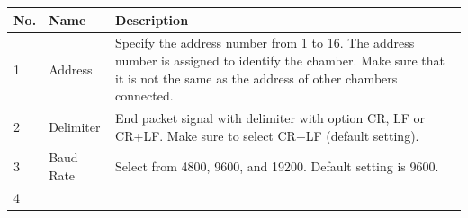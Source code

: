\begin{longtable}[]{@{}|l|l|l|@{}}
\toprule
\rowcolor{brown}\begin{minipage}[b]{0.04\columnwidth}\raggedright
{\bf{No.}}\strut
\end{minipage} & \begin{minipage}[b]{0.23\columnwidth}\raggedright
{\bf{Name}}\strut
\end{minipage} & \begin{minipage}[b]{0.65\columnwidth}\raggedright
{\bf{Description}}\strut
\end{minipage}\tabularnewline
\midrule
\endhead
\begin{minipage}[t]{0.04\columnwidth}\raggedright
1\strut
\end{minipage} & \begin{minipage}[t]{0.23\columnwidth}\raggedright
Address\strut
\end{minipage} & \begin{minipage}[t]{0.65\columnwidth}\raggedright
Specify the address number from 1 to 16. The address number is assigned
to identify the chamber. Make sure that it is not the same as the
address of other chambers connected.\strut
\end{minipage}\tabularnewline
\begin{minipage}[t]{0.04\columnwidth}\raggedright
2\strut
\end{minipage} & \begin{minipage}[t]{0.23\columnwidth}\raggedright
Delimiter\strut
\end{minipage} & \begin{minipage}[t]{0.65\columnwidth}\raggedright
End packet signal with delimiter with option CR, LF or CR+LF. Make sure
to select CR+LF (default setting).\strut
\end{minipage}\tabularnewline
\begin{minipage}[t]{0.04\columnwidth}\raggedright
3\strut
\end{minipage} & \begin{minipage}[t]{0.23\columnwidth}\raggedright
Baud Rate\strut
\end{minipage} & \begin{minipage}[t]{0.65\columnwidth}\raggedright
Select from 4800, 9600, and 19200. Default setting is 9600.\strut
\end{minipage}\tabularnewline
\begin{minipage}[t]{0.04\columnwidth}\raggedright
4\strut
\end{minipage} & \begin{minipage}[t]{0.23\columnwidth}\raggedright

\end{minipage}
\end{longtable}
